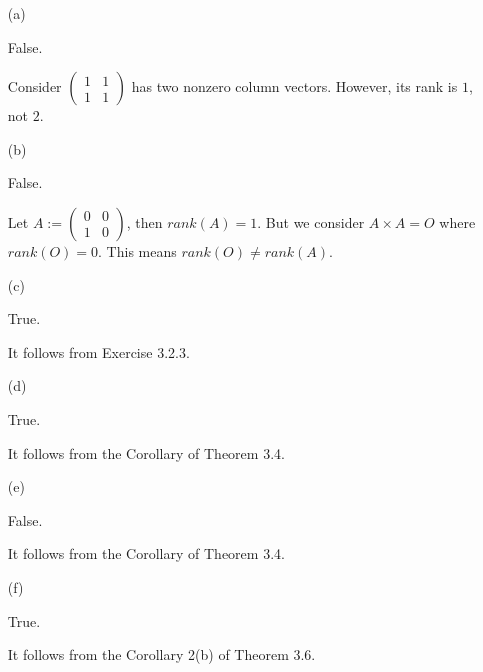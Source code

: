 \begin{Exercise}
\begin{enumerate}[(a)]
\item[(a)]
\begin{answer}
False.
\end{answer}
\begin{solution}
Consider $\begin{pmatrix}
1 & 1 \\
1 & 1
\end{pmatrix}$ has two nonzero column vectors. However, its rank is $1$, not $2$.
\end{solution}

\item[(b)]
\begin{answer}
False.
\end{answer}
\begin{solution}
Let $A := \begin{pmatrix}
0 & 0 \\
1 & 0
\end{pmatrix}$, then $rank(A) = 1$. But we consider $A\times A = O$ where $rank(O) = 0$. This means $rank(O)\neq rank(A)$.
\end{solution}

\item[(c)]
\begin{answer}
True.
\end{answer}
\begin{solution}
It follows from Exercise 3.2.3.
\end{solution}

\item[(d)]
\begin{answer}
True.
\end{answer}
\begin{solution}
It follows from the Corollary of Theorem 3.4.
\end{solution}

\item[(e)]
\begin{answer}
False.
\end{answer}
\begin{solution}
It follows from the Corollary of Theorem 3.4.
\end{solution}

\item[(f)]
\begin{answer}
True.
\end{answer}
\begin{solution}
It follows from the Corollary 2(b) of Theorem 3.6.
\end{solution}


\end{enumerate}
\end{Exercise}

